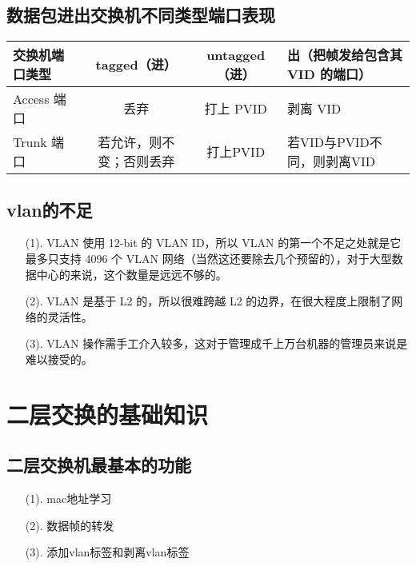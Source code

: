 \documentclass[a4paper,left=1.5cm,right=1.5cm,11pt]{article}
\begin{document}
\subsection{数据包进出交换机不同类型端口表现}
\begin{center}
\begin{tabular}{|l|c|c|l|}
 \hline
交换机端口类型& tagged（进）& untagged（进）&出（把帧发给包含其 VID 的端口）\\
 \hline
Access 端口 & 丢弃 & 打上 PVID &剥离 VID\\
 \hline
Trunk 端口 & 若允许，则不变；否则丢弃 & 打上PVID&若VID与PVID不同，则剥离VID \\
 \hline
\end{tabular}
\end{center}
\subsection{vlan的不足}
\begin{itemize}
	\item[(1).]VLAN 使用 12-bit 的 VLAN ID，所以 VLAN 的第一个不足之处就是它最多只支持 4096 个
	 VLAN 网络（当然这还要除去几个预留的），对于大型数据中心的来说，这个数量是远远不够的。
	\item[(2).]VLAN 是基于 L2 的，所以很难跨越 L2 的边界，在很大程度上限制了网络的灵活性。
	\item[(3).]VLAN 操作需手工介入较多，这对于管理成千上万台机器的管理员来说是难以接受的。
\end{itemize}


\section{二层交换的基础知识}
\subsection{二层交换机最基本的功能}
\begin{itemize}
	\item[(1).]mac地址学习
	\item[(2).]数据帧的转发
	\item[(3).]添加vlan标签和剥离vlan标签
\end{itemize}
\end{document}
